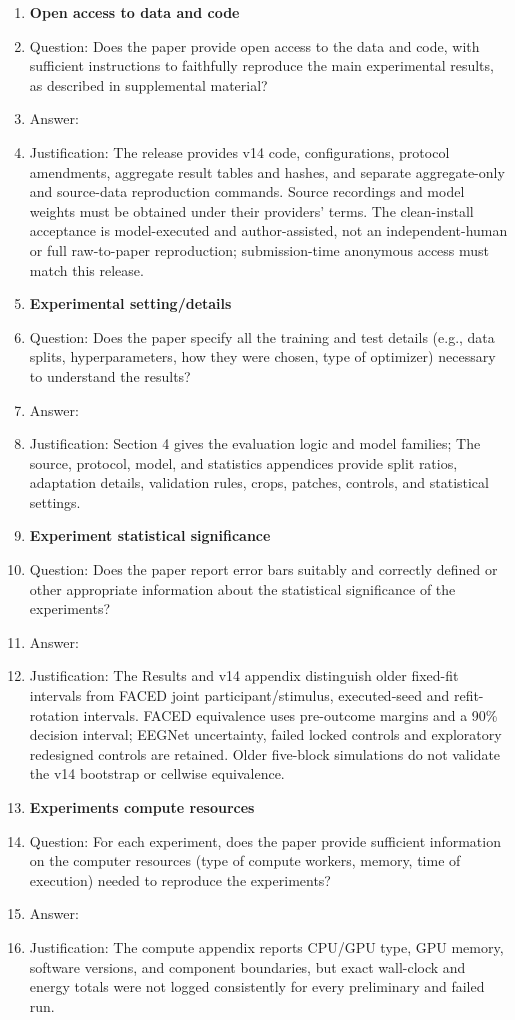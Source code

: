 \begin{enumerate}
\item {\bf Open access to data and code}
    \item[] Question: Does the paper provide open access to the data and code, with sufficient instructions to faithfully reproduce the main experimental results, as described in supplemental material?
    \item[] Answer: \answerYes{}
    \item[] Justification: The release provides v14 code, configurations, protocol amendments, aggregate result tables and hashes, and separate aggregate-only and source-data reproduction commands. Source recordings and model weights must be obtained under their providers' terms. The clean-install acceptance is model-executed and author-assisted, not an independent-human or full raw-to-paper reproduction; submission-time anonymous access must match this release.


\item {\bf Experimental setting/details}
    \item[] Question: Does the paper specify all the training and test details (e.g., data splits, hyperparameters, how they were chosen, type of optimizer) necessary to understand the results?
    \item[] Answer: \answerYes{}
    \item[] Justification: Section 4 gives the evaluation logic and model families; The source, protocol, model, and statistics appendices provide split ratios, adaptation details, validation rules, crops, patches, controls, and statistical settings.

\item {\bf Experiment statistical significance}
    \item[] Question: Does the paper report error bars suitably and correctly defined or other appropriate information about the statistical significance of the experiments?
    \item[] Answer: \answerYes{}
    \item[] Justification: The Results and v14 appendix distinguish older fixed-fit intervals from FACED joint participant/stimulus, executed-seed and refit-rotation intervals. FACED equivalence uses pre-outcome margins and a 90\% decision interval; EEGNet uncertainty, failed locked controls and exploratory redesigned controls are retained. Older five-block simulations do not validate the v14 bootstrap or cellwise equivalence.

\item {\bf Experiments compute resources}
    \item[] Question: For each experiment, does the paper provide sufficient information on the computer resources (type of compute workers, memory, time of execution) needed to reproduce the experiments?
    \item[] Answer: \answerNo{}
    \item[] Justification: The compute appendix reports CPU/GPU type, GPU memory, software versions, and component boundaries, but exact wall-clock and energy totals were not logged consistently for every preliminary and failed run.
    

\end{enumerate}
